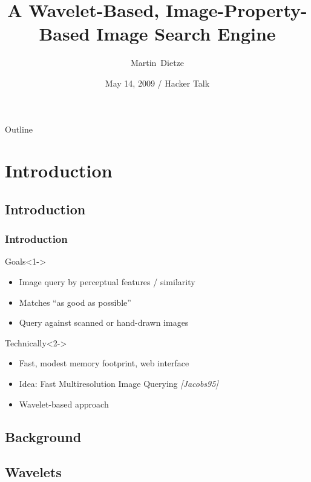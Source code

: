\documentclass{beamer}
\title[Wavelet-Based Image Search] %
{A Wavelet-Based, Image-Property-Based Image Search Engine}
\author{Martin~Dietze}
\institute{Freiheit.com Technologies}
\date[Short Occasion] %
{May 14, 2009 / Hacker Talk}
\begin{document}
\begin{frame}
  \titlepage
\end{frame}

\begin{frame}{Outline}
  \tableofcontents
\end{frame}



\section{Introduction}
\subsection{Introduction}

\begin{frame}
  \frametitle{Introduction}

  \begin{block}{Goals}<1->
    \begin{itemize}
    \item Image query by perceptual features / similarity
    \item Matches ``as good as possible''
    \item Query against scanned or hand-drawn images
    \end{itemize}
  \end{block}

  \begin{block}{Technically}<2->
    \begin{itemize}
    \item Fast, modest memory footprint, web interface
    \item Idea: Fast Multiresolution Image Querying \emph{[Jacobs95]}
    \item Wavelet-based approach
    \end{itemize}
  \end{block}
\end{frame}

\subsection{Background}

\subsection{Wavelets}
\end{document}
